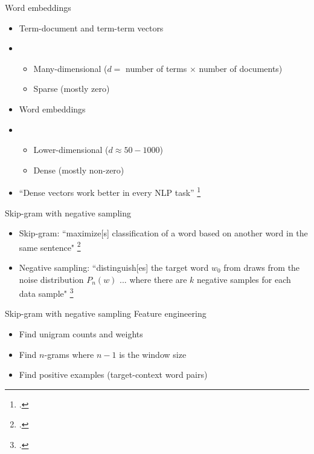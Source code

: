 \documentclass[10pt]{beamer}
\begin{document}
\begin{frame}
  {Word embeddings}
  \begin{itemize}
    \item Term-document and term-term vectors
    \item[]
          \begin{itemize}
            \item Many-dimensional ($d = $ number of terms $\times$ number of
                  documents)
            \item Sparse (mostly zero)
          \end{itemize}
    \item Word embeddings
    \item[]
          \begin{itemize}
            \item Lower-dimensional ($d \approx 50-1000$)
            \item Dense (mostly non-zero)
          \end{itemize}
    \item ``Dense vectors work better in every NLP task''
          \footcite[119]{Jurafsky2023}
  \end{itemize}
\end{frame}

\begin{frame}
  {Skip-gram with negative sampling}
  \begin{itemize}
    \item Skip-gram: ``maximize[s] classification of a word based on another
          word in the same sentence" \footcite[4]{Mikolov2013}
    \item Negative sampling: ``distinguish[es] the target word $w_0$ from draws
          from the noise distribution $P_n(w)$ ... where there are $k$ negative
          samples for each data sample" \footcite[4]{Mikolov2013a}
  \end{itemize}
\end{frame}

\begin{frame}
  {Skip-gram with negative sampling}
  {Feature engineering}
  \begin{itemize}
    \item Find unigram counts and weights
    \item Find $n$-grams where $n - 1$ is the window size
    \item Find positive examples (target-context word pairs)
  \end{itemize}
\end{frame}
\end{document}
